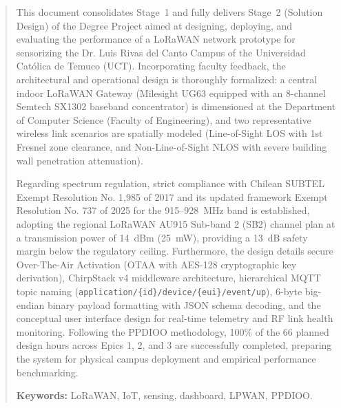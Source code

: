 \documentclass[12pt,oneside,openany,spanish,oldfontcommands]{memoir}
\begin{document}
\clearpage
\thispagestyle{empty}

\renewcommand{\abstractname}{Abstract}

\begin{abstract}

This document consolidates Stage~1 and fully delivers Stage~2 (Solution Design) of the Degree Project aimed at designing, deploying, and evaluating the performance of a LoRaWAN network prototype for sensorizing the Dr. Luis Rivas del Canto Campus of the Universidad Católica de Temuco (UCT). Incorporating faculty feedback, the architectural and operational design is thoroughly formalized: a central indoor LoRaWAN Gateway (Milesight UG63 equipped with an 8-channel Semtech SX1302 baseband concentrator) is dimensioned at the Department of Computer Science (Faculty of Engineering), and two representative wireless link scenarios are spatially modeled (Line-of-Sight LOS with 1st Fresnel zone clearance, and Non-Line-of-Sight NLOS with severe building wall penetration attenuation).

Regarding spectrum regulation, strict compliance with Chilean SUBTEL Exempt Resolution No. 1,985 of 2017 and its updated framework Exempt Resolution No. 737 of 2025 for the 915--928~MHz band is established, adopting the regional LoRaWAN AU915 Sub-band 2 (SB2) channel plan at a transmission power of 14~dBm (25~mW), providing a 13~dB safety margin below the regulatory ceiling. Furthermore, the design details secure Over-The-Air Activation (OTAA with AES-128 cryptographic key derivation), ChirpStack v4 middleware architecture, hierarchical MQTT topic naming (\texttt{application/\{id\}/device/\{eui\}/event/up}), 6-byte big-endian binary payload formatting with JSON schema decoding, and the conceptual user interface design for real-time telemetry and RF link health monitoring. Following the PPDIOO methodology, 100\% of the 66 planned design hours across Epics 1, 2, and 3 are successfully completed, preparing the system for physical campus deployment and empirical performance benchmarking.

\textbf{Keywords:} LoRaWAN, IoT, sensing, dashboard, LPWAN, PPDIOO.
\end{abstract}

\clearpage
{}
\setcounter{page}{1}
\pagestyle{mainstyle}
\end{document}
